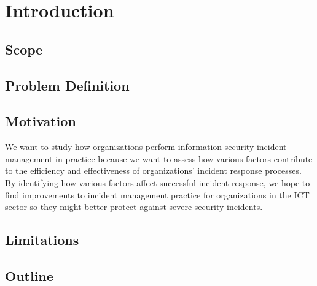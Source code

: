\chapter{Introduction}
\section{Scope}

\section{Problem Definition}

\section{Motivation}
We want to study how organizations perform information security incident management in practice because we want to assess how various factors contribute to the efficiency and effectiveness of organizations’ incident response processes. By identifying how various factors affect successful incident response, we hope to find improvements to incident management practice for organizations in the ICT sector so they might better protect against severe security incidents. 

\section{Limitations}

\section{Outline}